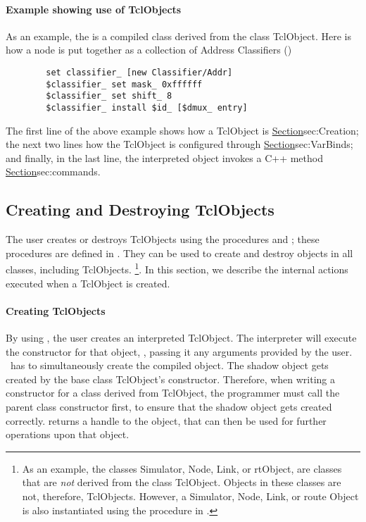 \documentclass{article}
\begin{document}
\paragraph{Example showing use of TclObjects}
As an example, the
is a compiled class derived from the class TclObject.
Here is how a node is put together as a collection of
Address Classifiers ()
\begin{verbatim}
        set classifier_ [new Classifier/Addr]
        $classifier_ set mask_ 0xffffff
        $classifier_ set shift_ 8
        $classifier_ install $id_ [$dmux_ entry]
\end{verbatim}
The first line of the above example shows how a TclObject is 
\href{created (or destroyed)}{Section}{sec:Creation};
the next two lines how the TclObject is configured through
\href{the bound variables}{Section}{sec:VarBinds};
and finally, in the last line,
the interpreted object invokes a C++ method
\href{as if they were an instance procedure}{Section}{sec:commands}.

\subsection{Creating and Destroying TclObjects}
\label{sec:Creation}

The user creates or destroys TclObjects
using the procedures  and ;
these procedures are defined in .
They can be used to create and destroy objects in all classes,
including TclObjects.%
\footnote{As an example, the classes Simulator, Node, Link, or rtObject,
are classes that are \emph{not} derived from the class TclObject.
Objects in these classes  are not, therefore, TclObjects.
However, a Simulator, Node, Link, or route Object is also instantiated
using the  procedure in \ns.}.
In this section,
we describe the internal actions executed when a TclObject
is created.

\paragraph{Creating TclObjects}
By using , the user creates an interpreted TclObject.
The interpreter will execute the constructor for that object, ,
passing it any arguments provided by the user.
\ns\ has to simultaneously create the compiled object.
The shadow object gets created by the 
base class TclObject's constructor.
Therefore, when writing a constructor for a class derived from TclObject,
the programmer must call the parent class constructor first,
to ensure that the shadow object gets created correctly.
 returns a handle to the object, that can then be used
for further operations upon that object.
\end{document}
